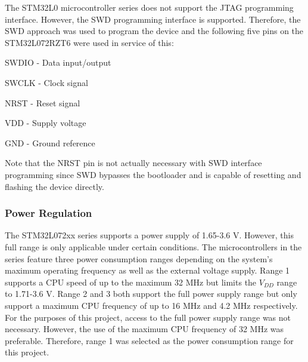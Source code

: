 



The STM32L0 microcontroller series does not support the JTAG programming interface. However, the SWD programming interface is supported. Therefore, the SWD approach was used to program the device and the following five pins on the STM32L072RZT6 were used in service of this:

\begin{compactitem}
	\item SWDIO - Data input/output
	\item SWCLK - Clock signal
	\item NRST - Reset signal
	\item VDD - Supply voltage
	\item GND - Ground reference
\end{compactitem}

Note that the NRST pin is not actually necessary with SWD interface programming since SWD bypasses the bootloader and is capable of resetting and flashing the device directly.


\subsubsection{Power Regulation}

The STM32L072xx series supports a power supply of 1.65-3.6 V. However, this full range is only applicable under certain conditions. The microcontrollers in the series feature three power consumption ranges depending on the system's maximum operating frequency as well as the external voltage supply. Range 1 supports a CPU speed of up to the maximum 32 MHz but limits the $V_{DD}$ range to 1.71-3.6 V. Range 2 and 3 both support the full power supply range but only support a maximum CPU frequency of up to 16 MHz and 4.2 MHz respectively. For the purposes of this project, access to the full power supply range was not necessary. However, the use of the maximum CPU frequency of 32 MHz was preferable. Therefore, range 1 was selected as the power consumption range for this project.

